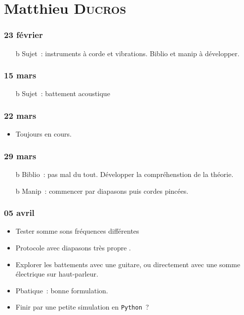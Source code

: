 \documentclass[a4paper, 11pt, final, garamond]{book}
\begin{document}
\chapter{Matthieu \textsc{Ducros}}
\label{ch:ducros}
\subsection{23 février}
\begin{itemize}
	\item[b]{Sujet}~: instruments à corde et vibrations. Biblio et manip à
	développer.
\end{itemize}

\subsection{15 mars}
\begin{itemize}
	\item[b]{Sujet}~: battement acoustique
\end{itemize}

\subsection{22 mars}
\begin{itemize}
	\item Toujours en cours.
\end{itemize}

\subsection{29 mars}
\begin{itemize}
	\item[b]{Biblio}~: pas mal du tout. Développer la compréhenstion de la théorie.
	\item[b]{Manip}~: commencer par diapasons puis cordes pincées.
\end{itemize}

\subsection{05 avril}
\begin{itemize}
	\item Tester somme sons fréquences différentes
	\item Protocole avec diapasons très propre \cmark.
	\item Explorer les battements avec une guitare, ou directement avec une somme
	      électrique sur haut-parleur.
	\item Pbatique~: bonne formulation.
	\item Finir par une petite simulation en \texttt{Python}~?
\end{itemize}
\end{document}
